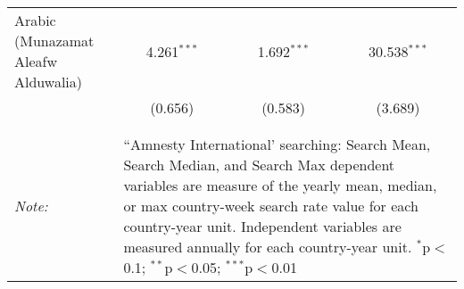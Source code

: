 \begin{table}[!htbp]
\begin{tabular}{@{\extracolsep{5pt}}lccc}
  Arabic (Munazamat Aleafw Alduwalia) & 4.261$^{***}$ & 1.692$^{***}$ & 30.538$^{***}$ \\ 
  & (0.656) & (0.583) & (3.689) \\ 
 \hline \\[-1.8ex] 
\hline 
\hline \\[-1.8ex] 
\textit{Note:}  & \multicolumn{3}{l}{\parbox[t]{8cm}{``Amnesty International' searching: Search Mean, Search Median, and Search Max dependent variables are measure of the yearly mean, median, or max country-week search rate value for each country-year unit. Independent variables are measured annually for each country-year unit. $^{*}$p$<$0.1; $^{**}$p$<$0.05; $^{***}$p$<$0.01}} \\ 
\end{tabular} 
\end{table} 
